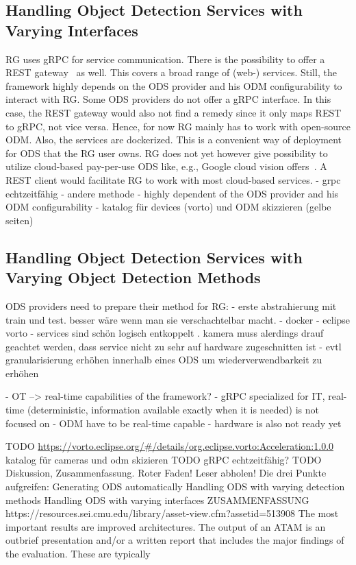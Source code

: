 \subsection{Handling Object Detection Services with Varying Interfaces}
RG uses gRPC for service communication. There is the possibility to offer a REST gateway~\cite{gRPC-Gateway-Documentation2017Grpc-gateway.2018} as well. This covers a broad range of (web-) services. Still, the framework highly depends on the ODS provider and his ODM configurability to interact with RG. Some ODS providers do not offer a gRPC interface. In this case, the REST gateway would also not find a remedy since it only maps REST to gRPC, not vice versa. Hence, for now RG mainly has to work with open-source ODM. Also, the services are dockerized. This is a convenient way of deployment for ODS that the RG user owns. RG does not yet however give possibility to utilize cloud-based pay-per-use ODS like, e.g., Google cloud vision offers~\cite{Google-Cloud-Documentation2019Google2019-04-26}. A REST client would facilitate RG to work with most cloud-based services.
- grpc echtzeitfähig
- andere methode 
- highly dependent of the ODS provider and his ODM configurability
- katalog für devices (vorto) und ODM skizzieren (gelbe seiten)

\subsection{Handling Object Detection Services with Varying Object Detection Methods}
ODS providers need to prepare their method for RG:
- erste abstrahierung mit train und test. besser wäre wenn man sie verschachtelbar macht.
- docker
- eclipse vorto
- services sind schön logisch entkoppelt . kamera muss alerdings drauf geachtet werden, dass service nicht zu sehr auf hardware zugeschnitten ist 
- evtl granularisierung erhöhen innerhalb eines ODS um wiederverwendbarkeit zu erhöhen

- OT --> real-time capabilities of the framework?
    - gRPC specialized for IT, real-time (deterministic, information available exactly when it is needed) is not focused on
    - ODM have to be real-time capable
    - hardware is also not ready yet

TODO    \url{https://vorto.eclipse.org/#/details/org.eclipse.vorto:Acceleration:1.0.0}
    katalog für cameras und odm skizieren
TODO gRPC echtzeitfähig?
TODO Diskussion, Zusammenfassung. Roter Faden! Leser abholen! Die drei Punkte aufgreifen:     Generating ODS automatically
    Handling ODS with varying detection methods
    Handling ODS with varying interfaces
ZUSAMMENFASSUNG https://resources.sei.cmu.edu/library/asset-view.cfm?assetid=513908
The most important results are improved architectures. The output of an ATAM is an outbrief presentation and/or a written report that includes the major findings of the evaluation. These are typically

